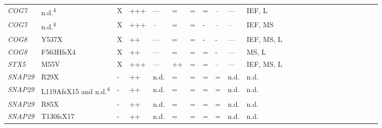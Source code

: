 \begin{landscape}
\begin{longtable}[c]{C{1.2cm}C{2cm}C{0.5cm}C{1.5cm}C{1.5cm}C{0.5cm}C{0.5cm}C{0.5cm}C{0.5cm}C{1.5cm}C{1.5cm}C{1.5cm}c c c c c c c c c c c c}
        \emph{COG7} & n.d.\textsuperscript{4} & X                       & +++                                      & ---                                 & =   & = & =   & --  & ---                                  & IEF, L                       & \cite{morava_common_2007,ng_molecular_2007,spaapen_clinical_2005,wu_mutation_2004} \\
        \emph{COG7} & n.d.\textsuperscript{4} & X                       & +++                                      & --                                 & =   & = & -   & --  & --                                  & IEF, MS                       & \cite{zeevaert_new_2009} \\
        \emph{COG8} & Y537X & X                       & ++                                      & ---                                 & =   & = & -   & -  & ---                                  & IEF, MS, L                      & \cite{foulquier_new_2007} \\
        \emph{COG8} & F563HfsX4 & X                       & ++                                      & ---                                 & =   & = & =   & -  & ---                                  & MS, L                      & \cite{kranz_cog8_2007} \\
        \emph{STX5} & M55V & X                       & +++                                      & ---                                 & ++   & = & =   & --  & ---                                  & IEF, MS, L                      & \cite{linders_congenital_2020} \\
        \emph{SNAP29} & R29X & -                       & ++                                      & n.d.                                 & =   & = & =   & =  & n.d.                                  & n.d.                      & \cite{hsu_cednik_2017} \\
        \emph{SNAP29} & L119AfsX15 and n.d.\textsuperscript{4} & -                       & ++                                      & n.d.                                 & =   & = & =   & =  & n.d.                                  & n.d.                      & \cite{llaci_compound_2019} \\
        \emph{SNAP29} & R85X & -                       & ++                                      & n.d.                                 & =   & = & =   & =  & n.d.                                  & n.d.                      & \cite{poojary_cednik_2019} \\
        \emph{SNAP29} & T130fsX17 & -                       & ++                                      & n.d.                                 & =   & = & =   & =  & n.d.                                  & n.d.                      & \cite{mcdonald-mcginn_hemizygous_2013} \\

\end{longtable}
\end{landscape}
